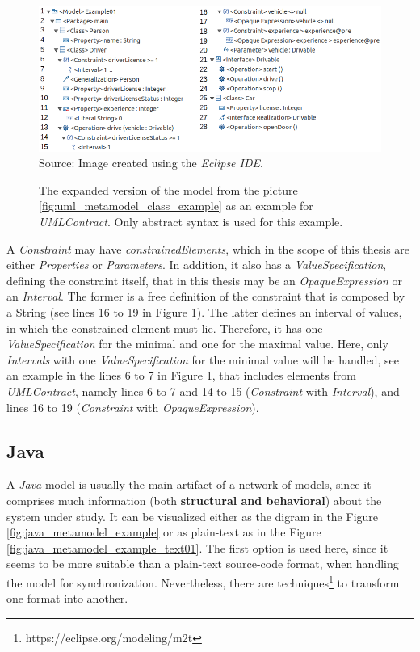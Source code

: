 \documentclass[tuberlin,cic,tc,english,noabntcite,oneside]{iiufrgs}
\begin{document}
\begin{figure}[H]
	\centering
    \caption{The expanded version of the model from the picture \ref{fig:uml_metamodel_class_example} as an example for \emph{UMLContract}. Only abstract syntax is used for this example.}
    \includegraphics[width=\textwidth]{umlContractDiagramExample01} \\
    Source: Image created using the \emph{Eclipse IDE}.
    \label{fig:uml_metamodel_contracts_example}
\end{figure}

A \emph{Constraint} may have \emph{constrainedElements}, which in the scope of this thesis are either \emph{Properties} or \emph{Parameters}. In addition, it also has a \emph{ValueSpecification}, defining the constraint itself, that in this thesis may be an \emph{OpaqueExpression} or an \emph{Interval}. The former is a free definition of the constraint that is composed by a String (see lines 16 to 19 in Figure \ref{fig:uml_metamodel_contracts_example}). The latter defines an interval of values, in which the constrained element must lie. Therefore, it has one \emph{ValueSpecification} for the minimal and one for the maximal value. Here, only \emph{Intervals} with one \emph{ValueSpecification} for the minimal value will be handled, see an example in the lines 6 to 7 in Figure \ref{fig:uml_metamodel_contracts_example}, that includes elements from \emph{UMLContract}, namely lines 6 to 7 and 14 to 15 (\emph{Constraint} with \emph{Interval}), and lines 16 to 19 (\emph{Constraint} with \emph{OpaqueExpression}).

\subsection{Java}
A \emph{Java} model is usually the main artifact of a network of models, since it comprises much information (both \textbf{structural and behavioral}) about the system under study. It can be visualized either as the digram in the Figure \ref{fig:java_metamodel_example} or as plain-text as in the Figure \ref{fig:java_metamodel_example_text01}. The first option is used here, since it seems to be more suitable than a plain-text source-code format, when handling the model for synchronization. Nevertheless, there are techniques\footnote{https://eclipse.org/modeling/m2t} to transform one format into another.
\end{document}
